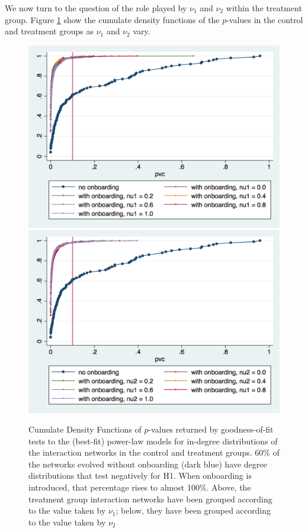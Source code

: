 \documentclass{article}
\begin{document}
We now turn to the question of the role played by $\nu_1$ and $\nu_2$ within the treatment group. Figure \ref{fig:CDFpvcnu_1nu_2} show the cumulate density functions of the $p$-values in the control and treatment groups as $\nu_1$ and $\nu_2$ vary. 

\begin{figure}[thb]
\centering

	\includegraphics[width=.75\linewidth]{./Pictures/CDF_pvc_nu1.png}\label{fig:CDFnu_1}
	\includegraphics[width=.75\linewidth]{./Pictures/CDF_pvc_nu2.png}\label{fig:CDFnu_2}
  \caption{Cumulate Density Functions of $p$-values returned by goodness-of-fit tests to the (best-fit) power-law models for in-degree distributions of the interaction networks in the control and treatment groups. 60\% of the networks evolved without onboarding (dark blue) have degree distributions that test negatively for H1. When onboarding is introduced, that percentage rises to almost 100\%. Above, the treatment group interaction networks have been grouped according to the value taken by $\nu_1$; below, they have been grouped according to the value taken by $\nu_2$ } 
 \label{fig:CDFpvcnu_1nu_2}
\end{figure}
\end{document}
